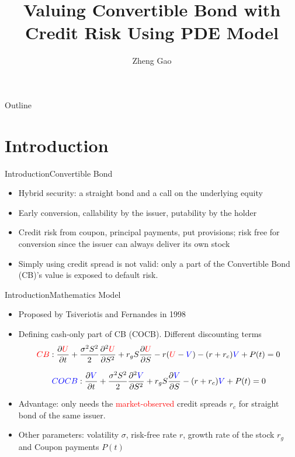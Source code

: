 \documentclass{beamer}
\title[CB pricing \hspace{0.5cm}\insertframenumber/\inserttotalframenumber]{
Valuing Convertible Bond with Credit Risk Using PDE Model}
\author{Zheng Gao}
\institute{}
\date{}
\begin{document}
\begin{frame}
  \titlepage
\end{frame}


\begin{frame}{Outline}
  \tableofcontents
\end{frame}

\section{Introduction}
\begin{frame}{Introduction}{Convertible Bond}
	\begin{itemize}
		\item Hybrid security: a straight bond and a call on the underlying equity
		\item Early conversion, 
			  callability by the issuer, putability by the holder
		\item Credit risk from coupon, principal payments, put provisions; risk free for conversion since the issuer can always deliver its own stock
		\item Simply using credit spread is not valid: only a part of the Convertible Bond (CB)'s value is exposed to default risk.
	\end{itemize}
\end{frame}

\begin{frame}[shrink=10] {Introduction}{Mathematics Model}
	\begin{itemize}
		\item Proposed by Tsiveriotis and Fernandes in 1998
		\item Defining cash-only part of CB (COCB). Different discounting terms
\begin{equation*}
\textcolor{red}{CB}: \frac{\partial{\textcolor{red}{U}}}{\partial{t}} + 
\frac{\sigma^2S^2}{2}\frac{\partial^2{\textcolor{red}{U}}}{\partial{S}^2} + r_gS\frac{\partial{\textcolor{red}{U}}}{\partial{S}} - r(\textcolor{red}{U}-\textcolor{blue}{V}) - (r+r_c)\textcolor{blue}{V} + P(t) = 0 
\label{eq:CB}
\end{equation*}

\begin{equation*}
\textcolor{blue}{COCB}: \frac{\partial{\textcolor{blue}{V}}}{\partial{t}} + 
\frac{\sigma^2S^2}{2}\frac{\partial^2{\textcolor{blue}{V}}}{\partial{S}^2} + r_gS\frac{\partial{\textcolor{blue}{V}}}{\partial{S}} - (r+r_c)\textcolor{blue}{V} + P(t) = 0 
\label{eq:COCB}
\end{equation*}
	\item Advantage: only needs the \textcolor{red}{market-observed} credit spreads $r_c$ for straight bond of the same issuer.
	\item Other parameters: volatility $\sigma$, risk-free rate $r$, growth rate of the stock $r_g$ and Coupon payments $P(t)$  
	\end{itemize}
\end{frame}
\end{document}
